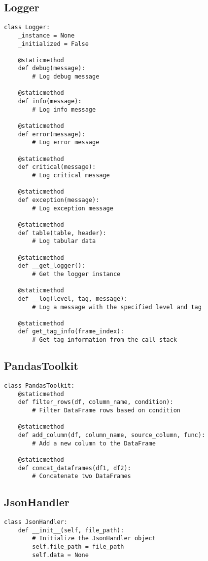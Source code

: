 \documentclass[11pt,a4paper]{report}
\begin{document}
\subsection{Logger}
\begin{lstlisting}
class Logger:
    _instance = None
    _initialized = False
    
    @staticmethod
    def debug(message):
        # Log debug message
        
    @staticmethod
    def info(message):
        # Log info message
        
    @staticmethod
    def error(message):
        # Log error message
        
    @staticmethod
    def critical(message):
        # Log critical message
        
    @staticmethod
    def exception(message):
        # Log exception message
        
    @staticmethod
    def table(table, header):
        # Log tabular data
        
    @staticmethod
    def __get_logger():
        # Get the logger instance
        
    @staticmethod
    def __log(level, tag, message):
        # Log a message with the specified level and tag
        
    @staticmethod
    def get_tag_info(frame_index):
        # Get tag information from the call stack
\end{lstlisting}

\subsection{PandasToolkit}
\begin{lstlisting}
class PandasToolkit:
    @staticmethod
    def filter_rows(df, column_name, condition):
        # Filter DataFrame rows based on condition
        
    @staticmethod
    def add_column(df, column_name, source_column, func):
        # Add a new column to the DataFrame
        
    @staticmethod
    def concat_dataframes(df1, df2):
        # Concatenate two DataFrames
\end{lstlisting}

\subsection{JsonHandler}
\begin{lstlisting}
class JsonHandler:
    def __init__(self, file_path):
        # Initialize the JsonHandler object
        self.file_path = file_path
        self.data = None
\end{lstlisting}
\end{document}

